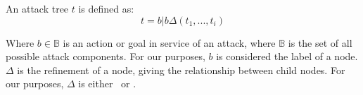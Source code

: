 \begin{definition} \label{def:attack-tree}

An attack tree $t$ is defined as:
\[
    t = b | b\Delta(t_1, ..., t_i)
\]

Where $b \in \mathbb{B}$ is an action or goal in service of an attack, where $\mathbb{B}$ is the set of all possible attack components. For our purposes, $b$ is considered the label of a node. $\Delta$ is the refinement of a node, giving the relationship between child nodes. For our purposes, $\Delta$ is either \AND\ or \OR.








\end{definition}
